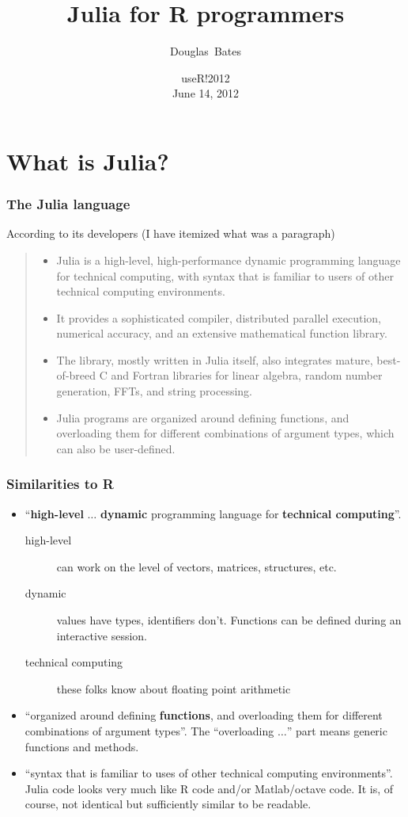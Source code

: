 \documentclass[dvipsnames,pdflatex,beamer]{beamer}
\title[Julia]{Julia for R programmers}
\author[Douglas Bates] {Douglas~Bates}
\institute[U. Wisc.]{University of Wisconsin - Madison\\
  {\texttt{<Bates@Wisc.edu>}}}
\date[2012-06-14]{useR!2012\\June 14, 2012}
\begin{document}
\section[What is Julia?]{What is Julia?}
\begin{frame}
  \frametitle{The Julia language}
  According to its developers (I have itemized what was a paragraph)
  \begin{quote}
    \begin{itemize}
    \item Julia is a high-level, high-performance dynamic programming
      language for technical computing, with syntax that is familiar to
      users of other technical computing environments.
    \item It provides a sophisticated compiler, distributed parallel
      execution, numerical accuracy, and an extensive mathematical
      function library.
    \item The library, mostly written in Julia itself, also integrates
      mature, best-of-breed C and Fortran libraries for linear algebra,
      random number generation, FFTs, and string processing.
    \item Julia programs are organized around defining functions, and
      overloading them for different combinations of argument types,
      which can also be user-defined.
    \end{itemize}
  \end{quote}
\end{frame}
\begin{frame}
  \frametitle{Similarities to R}
  \begin{itemize}
  \item ``\textbf{high-level} $\dots$ \textbf{dynamic} programming language
    for \textbf{technical computing}''.
    \begin{description}
    \item[high-level] can work on the level of vectors, matrices, structures, etc.
    \item[dynamic] values have types, identifiers don't.  Functions
      can be defined during an interactive session.
    \item[technical computing] these folks know about floating point arithmetic
    \end{description}
  \item ``organized around defining \textbf{functions}, and
    overloading them for different combinations of argument types''.
    The ``overloading $\dots$'' part means generic functions and methods.
  \item ``syntax that is familiar to uses of other technical computing
    environments''. Julia code looks very much like R code and/or
    Matlab/octave code.  It is, of course, not identical but
    sufficiently similar to be readable.
  \end{itemize}
\end{frame}
\end{document}
